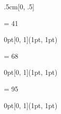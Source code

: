 {\begin{textblock*}{.5cm}[0, .5]
    \noindent\resizebox{.5cm}{!}{\(\pi\)}
  \end{textblock*}
  \fi
  \ifnum\value{page} = 41 %
  \begin{textblock*}{0pt}[0, 1](1pt, 1pt)
    \noindent\scalebox{0.0000001}{\textcolor{white}{blowjob}}
  \end{textblock*}
  \fi
  \ifnum\value{page} = 68 %
  \begin{textblock*}{0pt}[0, 1](1pt, 1pt)
    \noindent\scalebox{0.0000001}{\textcolor{white}{kamasutra}}
  \end{textblock*}
  \fi
  \fi
  \ifnum\value{page} = 95 %
  \begin{textblock*}{0pt}[0, 1](1pt, 1pt)
  \end{textblock*}
  \fi
}
\makeatother